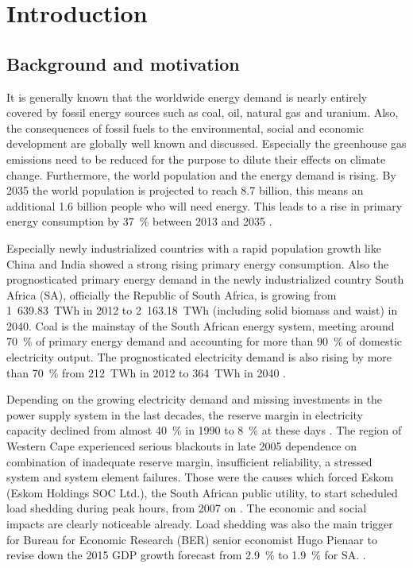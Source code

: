 \chapter{Introduction}
%

\section{Background and motivation}
It is generally known that the worldwide energy demand is nearly entirely covered by fossil energy sources such as coal, oil, natural gas and uranium. Also, the consequences of fossil fuels to the environmental, social and economic development are globally well known and discussed. Especially the greenhouse gas emissions need to be reduced for the purpose to dilute their effects on climate change. Furthermore, the world population and the energy demand is rising. By 2035 the world population is projected to reach 8.7 billion, this means an additional 1.6 billion people who will need energy. This leads to a rise in primary energy consumption by 37~\% between 2013 and 2035 \cite{BP2015a}. 



Especially newly industrialized countries with a rapid population growth like China and India showed a strong rising primary energy consumption. Also the prognosticated primary energy demand in the newly industrialized country South Africa (SA), officially the Republic of South Africa, is growing from 1~639.83~TWh in 2012 to 2~163.18~TWh (including solid biomass and waist) in 2040. Coal is the mainstay of the South African energy system, meeting around 70~\% of primary energy demand and accounting for more than 90~\% of domestic electricity output. The prognosticated electricity demand is also rising by more than 70~\% from 212~TWh in 2012 to 364~TWh in 2040 \cite{IEA2014f}.



Depending on the growing electricity demand and missing investments in the power supply system in the last decades, the reserve margin in electricity capacity declined from almost 40~\% in 1990 to 8~\% at these days \cite{Trollip2014,Eskom2015}. The region of Western Cape experienced serious blackouts in late 2005 dependence on combination of inadequate reserve margin, insufficient reliability, a stressed system and system element failures. Those were the causes which forced Eskom (Eskom Holdings SOC Ltd.), the South African public utility, to start scheduled load shedding during peak hours, from 2007 on \cite{Trollip2014}. The economic and social impacts are clearly noticeable already. Load shedding was also the main trigger for Bureau for Economic Research (BER) senior economist Hugo Pienaar to revise down the 2015 GDP growth forecast from 2.9~\% to 1.9~\% for SA. \cite{Bisseker2015}.



